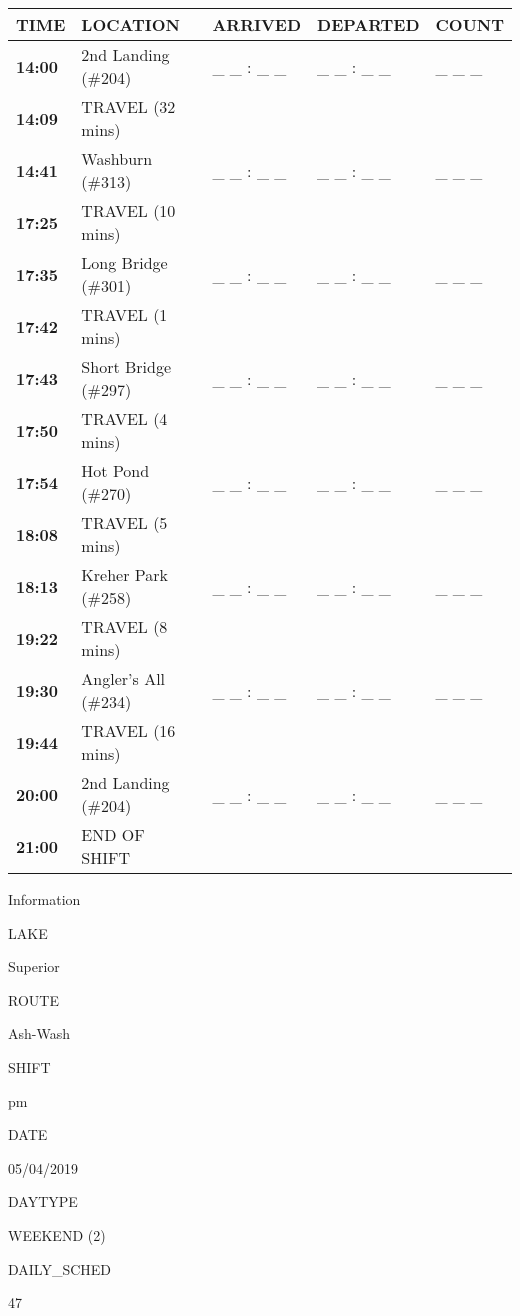 \documentclass[]{article}
\begin{document}
\begin{tabular}{>{\bfseries}lllll}
\toprule
\textbf{TIME} & \textbf{LOCATION} & \textbf{ARRIVED} & \textbf{DEPARTED} & \textbf{COUNT}\\
\midrule
14:00 & 2nd Landing (\#204) & \_ \_ : \_ \_ & \_ \_ : \_ \_ & \_ \_ \_\\
14:09 & TRAVEL (32 mins) &  &  & \\
14:41 & Washburn (\#313) & \_ \_ : \_ \_ & \_ \_ : \_ \_ & \_ \_ \_\\
17:25 & TRAVEL (10 mins) &  &  & \\
17:35 & Long Bridge (\#301) & \_ \_ : \_ \_ & \_ \_ : \_ \_ & \_ \_ \_\\
17:42 & TRAVEL (1 mins) &  &  & \\
17:43 & Short Bridge (\#297) & \_ \_ : \_ \_ & \_ \_ : \_ \_ & \_ \_ \_\\
17:50 & TRAVEL (4 mins) &  &  & \\
17:54 & Hot Pond (\#270) & \_ \_ : \_ \_ & \_ \_ : \_ \_ & \_ \_ \_\\
18:08 & TRAVEL (5 mins) &  &  & \\
18:13 & Kreher Park (\#258) & \_ \_ : \_ \_ & \_ \_ : \_ \_ & \_ \_ \_\\
19:22 & TRAVEL (8 mins) &  &  & \\
19:30 & Angler's All (\#234) & \_ \_ : \_ \_ & \_ \_ : \_ \_ & \_ \_ \_\\
19:44 & TRAVEL (16 mins) &  &  & \\
20:00 & 2nd Landing (\#204) & \_ \_ : \_ \_ & \_ \_ : \_ \_ & \_ \_ \_\\
21:00 & END OF SHIFT &  &  & \\
\bottomrule
\end{tabular}\newpage

Information

LAKE

Superior

ROUTE

Ash-Wash

SHIFT

pm

DATE

05/04/2019

DAYTYPE

WEEKEND (2)

DAILY\_SCHED

47

\vspace{24pt}
\end{document}
